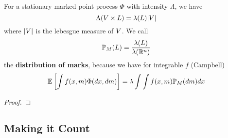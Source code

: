 \begin{lemma}[Campbell]\label{lem: Campbell}
	For a stationary marked point process \(\Phi\) with intensity \(\Lambda\),
	we have	
	\[
		\Lambda(V \times L) = \lambda(L) |V|
	\]
	where \(|V|\) is the lebesgue measure of \(V\). We call
	\[
		\mathbb{P}_M(L) = \frac{\lambda(L)}{\lambda(\mathbb{R}^n)}
	\]
	the \textbf{distribution of marks}, because we have for integrable \(f\)
	(Campbell)
	\[
		\mathbb{E}\left[\int f(x,m) \Phi(dx,dm)\right]
		= \lambda \int \int f(x,m) \mathbb{P}_M(dm) dx
	\]
\end{lemma}
\begin{proof}
\end{proof}

\subsection{Making it Count}

